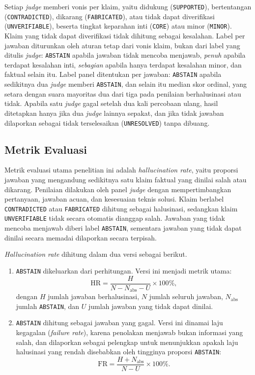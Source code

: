 Setiap \emph{judge} memberi vonis per klaim, yaitu didukung (\texttt{SUPPORTED}), bertentangan (\texttt{CONTRADICTED}), dikarang (\texttt{FABRICATED}), atau tidak dapat diverifikasi (\texttt{UNVERIFIABLE}), beserta tingkat keparahan inti (\texttt{CORE}) atau minor (\texttt{MINOR}). Klaim yang tidak dapat diverifikasi tidak dihitung sebagai kesalahan. Label per jawaban diturunkan oleh aturan tetap dari vonis klaim, bukan dari label yang ditulis \emph{judge}: \texttt{ABSTAIN} apabila jawaban tidak mencoba menjawab, \emph{penuh} apabila terdapat kesalahan inti, \emph{sebagian} apabila hanya terdapat kesalahan minor, dan faktual selain itu. Label panel ditentukan per jawaban: \texttt{ABSTAIN} apabila sedikitnya dua \emph{judge} memberi \texttt{ABSTAIN}, dan selain itu median skor ordinal, yang setara dengan suara mayoritas dua dari tiga pada penilaian berhalusinasi atau tidak. Apabila satu \emph{judge} gagal setelah dua kali percobaan ulang, hasil ditetapkan hanya jika dua \emph{judge} lainnya sepakat, dan jika tidak jawaban dilaporkan sebagai tidak terselesaikan (\texttt{UNRESOLVED}) tanpa dibuang.

\subsection{Metrik Evaluasi}
\label{subsec:metrik-evaluasi}

Metrik evaluasi utama penelitian ini adalah \emph{hallucination rate}, yaitu proporsi jawaban yang mengandung sedikitnya satu klaim faktual yang dinilai salah atau dikarang. Penilaian dilakukan oleh panel \emph{judge} dengan mempertimbangkan pertanyaan, jawaban acuan, dan kesesuaian teknis solusi. Klaim berlabel \texttt{CONTRADICTED} atau \texttt{FABRICATED} dihitung sebagai halusinasi, sedangkan klaim \texttt{UNVERIFIABLE} tidak secara otomatis dianggap salah. Jawaban yang tidak mencoba menjawab diberi label \texttt{ABSTAIN}, sementara jawaban yang tidak dapat dinilai secara memadai dilaporkan secara terpisah.


\emph{Hallucination rate} dihitung dalam dua versi sebagai berikut.
\begin{enumerate}
    \item \texttt{ABSTAIN} dikeluarkan dari perhitungan. Versi ini menjadi metrik utama:
    \begin{equation}
    \mathrm{HR}=\frac{H}{N-N_{\mathrm{abs}}-U}\times 100\%,
    \end{equation}
    dengan $H$ jumlah jawaban berhalusinasi, $N$ jumlah seluruh jawaban, $N_{\mathrm{abs}}$ jumlah \texttt{ABSTAIN}, dan $U$ jumlah jawaban yang tidak dapat dinilai.
    \item \texttt{ABSTAIN} dihitung sebagai jawaban yang gagal. Versi ini dinamai laju kegagalan (\emph{failure rate}), karena penolakan menjawab bukan informasi yang salah, dan dilaporkan sebagai pelengkap untuk menunjukkan apakah laju halusinasi yang rendah disebabkan oleh tingginya proporsi \texttt{ABSTAIN}:
    \begin{equation}
    \mathrm{FR}=\frac{H+N_{\mathrm{abs}}}{N-U}\times 100\%.
    \end{equation}
\end{enumerate}


